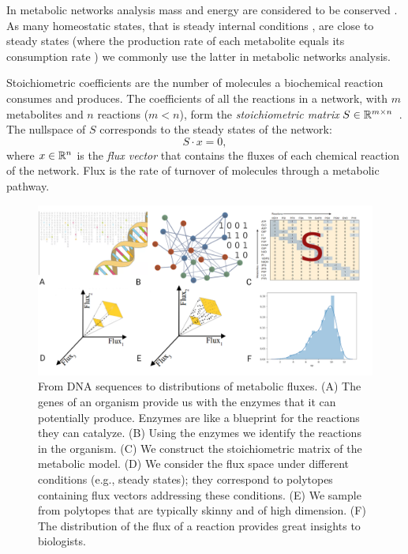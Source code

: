    In metabolic networks analysis mass and energy are considered to be conserved
   \cite{palsson2009metabolic}. As many homeostatic states, that is steady internal
   conditions \cite{shishvan2018homeostatic}, are close to steady states (where the
   production rate of each metabolite equals its consumption rate
   \cite{cakmak2012new}) we commonly use the latter in metabolic networks analysis.

   Stoichiometric coefficients are the number of molecules a biochemical reaction
   consumes and produces. The coefficients of all the reactions in a network,
   with $m$ metabolites and $n$ reactions ($m < n$),  form
   the \emph{stoichiometric matrix} $S\in {\mathbb R}^{m\times n}$~\cite{palsson2015systems}.
   The nullspace of $S$ corresponds to the steady states of the network:
   \begin{equation}
   \label{eq:Sv}
   S \cdot x = 0 ,
   \end{equation}
   where $x \in {\mathbb R}^n $ is the \textit{flux vector} that contains  the fluxes
   of each chemical reaction of the network.
   Flux is the rate of turnover of molecules through a metabolic pathway.
   \begin{figure}[!htbp]
      \includegraphics[width=1.0\columnwidth]{figures/flux_sampling_workflow.png}
      \caption[From DNA sequences to distributions of metabolic fluxes]{
         From DNA sequences to distributions of metabolic fluxes.
         (A) The genes of an organism provide us with the enzymes that it can potentially produce. Enzymes are like a blueprint for the reactions they can catalyze.
         (B) Using the enzymes we identify the reactions in the organism.
         (C) We construct the stoichiometric matrix of the metabolic  model.
         (D) We consider the flux space under different conditions (e.g., steady states);
         they correspond  to  polytopes containing flux vectors addressing these conditions.
         (E) We sample from polytopes that are typically skinny and of high dimension.
         (F) The distribution of the flux of a reaction provides  great insights
         to biologists.
      }
      \label{fig:sampling_workflow}
   \end{figure}

